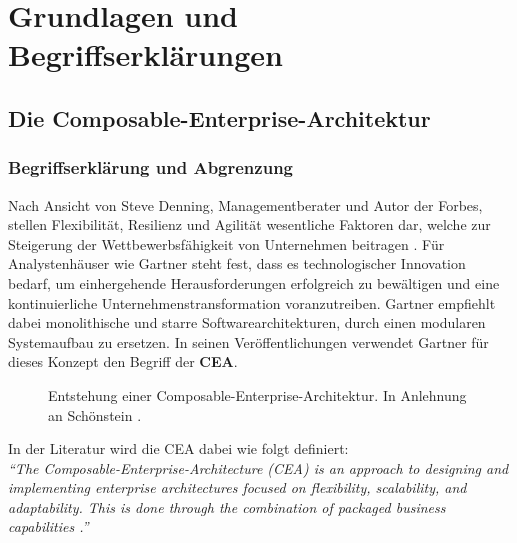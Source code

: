 \section{Grundlagen und Begriffserklärungen}

\subsection{Die Composable-Enterprise-Architektur}

\subsubsection{Begriffserklärung und Abgrenzung}
\label{sec:CEA_B}
Nach Ansicht von Steve Denning, Managementberater und Autor der Forbes, stellen Flexibilität, Resilienz und Agilität wesentliche Faktoren dar, welche zur Steigerung der Wettbewerbsfähigkeit von Unternehmen beitragen \cite{Denning.20170210}. Für Analystenhäuser wie Gartner steht fest, dass es technologischer Innovation bedarf, um einhergehende Herausforderungen erfolgreich zu bewältigen und eine kontinuierliche Unternehmenstransformation voranzutreiben. Gartner empfiehlt dabei monolithische und starre Softwarearchitekturen, durch einen modularen Systemaufbau zu ersetzen. In seinen Veröffentlichungen verwendet Gartner für dieses Konzept den Begriff der \textbf{\ac{CEA}}.
\begin{center}
	\begin{figure}[H]
		\centering
		\caption[Entstehung einer Composable-Enterprise-Architektur]{Entstehung einer Composable-Enterprise-Architektur. In Anlehnung an Schönstein \cite{Schonenstein.20230103}.}
		\label{fig:CEA_S}
	\end{figure}	
\end{center}
\vspace*{-15mm}
In der Literatur wird die CEA dabei wie folgt definiert:\vspace{2mm}\\
\textit{\enquote{The Composable-Enterprise-Architecture (CEA) is an approach to designing and implementing enterprise architectures focused on flexibility, scalability, and adaptability. This is done through the combination of packaged business capabilities \cite{Gartner.20230418}.}}\vspace{2mm}\\
